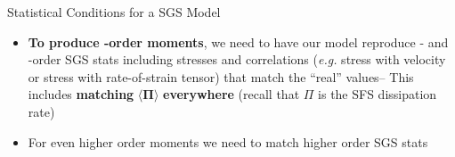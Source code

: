 \begin{frame}{Statistical Conditions for a SGS Model}
\begin{itemize}
	\item \textbf{To produce -order moments}, we need to have our model reproduce - and -order SGS stats including stresses and correlations (\textit{e.g.} stress with velocity or stress with rate-of-strain tensor) that match the ``real'' values-- This includes \textbf{matching} $\mathbf{\langle \Pi \rangle}$ \textbf{everywhere} (recall that $\Pi$ is the SFS dissipation rate)
	\item For even higher order moments we need to match higher order SGS stats
\end{itemize}
\end{frame}

